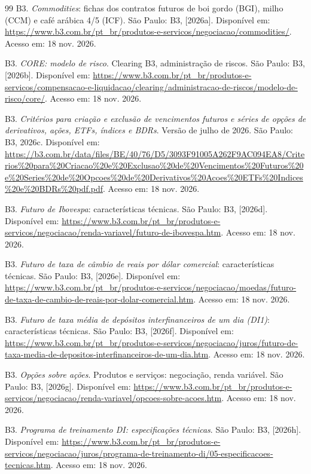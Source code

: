 \begin{thebibliography}{99}
B3. \emph{Commodities}: fichas dos contratos futuros de boi gordo (BGI), milho (CCM) e café arábica 4/5 (ICF). São Paulo: B3, [2026a]. Disponível em: \url{https://www.b3.com.br/pt_br/produtos-e-servicos/negociacao/commodities/}. Acesso em: 18 nov. 2026.

B3. \emph{CORE: modelo de risco}. Clearing B3, administração de riscos. São Paulo: B3, [2026b]. Disponível em: \url{https://www.b3.com.br/pt_br/produtos-e-servicos/compensacao-e-liquidacao/clearing/administracao-de-riscos/modelo-de-risco/core/}. Acesso em: 18 nov. 2026.

B3. \emph{Critérios para criação e exclusão de vencimentos futuros e séries de opções de derivativos, ações, ETFs, índices e BDRs}. Versão de julho de 2026. São Paulo: B3, 2026c. Disponível em: \url{https://b3.com.br/data/files/BE/40/76/D5/3093F91005A262F9AC094EA8/Criterios\%20para\%20Criacao\%20e\%20Exclusao\%20de\%20Vencimentos\%20Futuros\%20e\%20Series\%20de\%20Opcoes\%20de\%20Derivativos\%20Acoes\%20ETFs\%20Indices\%20e\%20BDRs\%20pdf.pdf}. Acesso em: 18 nov. 2026.

B3. \emph{Futuro de Ibovespa}: características técnicas. São Paulo: B3, [2026d]. Disponível em: \url{https://www.b3.com.br/pt_br/produtos-e-servicos/negociacao/renda-variavel/futuro-de-ibovespa.htm}. Acesso em: 18 nov. 2026.

B3. \emph{Futuro de taxa de câmbio de reais por dólar comercial}: características técnicas. São Paulo: B3, [2026e]. Disponível em: \url{https://www.b3.com.br/pt_br/produtos-e-servicos/negociacao/moedas/futuro-de-taxa-de-cambio-de-reais-por-dolar-comercial.htm}. Acesso em: 18 nov. 2026.

B3. \emph{Futuro de taxa média de depósitos interfinanceiros de um dia (DI1)}: características técnicas. São Paulo: B3, [2026f]. Disponível em: \url{https://www.b3.com.br/pt_br/produtos-e-servicos/negociacao/juros/futuro-de-taxa-media-de-depositos-interfinanceiros-de-um-dia.htm}. Acesso em: 18 nov. 2026.

B3. \emph{Opções sobre ações}. Produtos e serviços: negociação, renda variável. São Paulo: B3, [2026g]. Disponível em: \url{https://www.b3.com.br/pt_br/produtos-e-servicos/negociacao/renda-variavel/opcoes-sobre-acoes.htm}. Acesso em: 18 nov. 2026.

B3. \emph{Programa de treinamento DI: especificações técnicas}. São Paulo: B3, [2026h]. Disponível em: \url{https://www.b3.com.br/pt_br/produtos-e-servicos/negociacao/juros/programa-de-treinamento-di/05-especificacoes-tecnicas.htm}. Acesso em: 18 nov. 2026.


\end{thebibliography}
